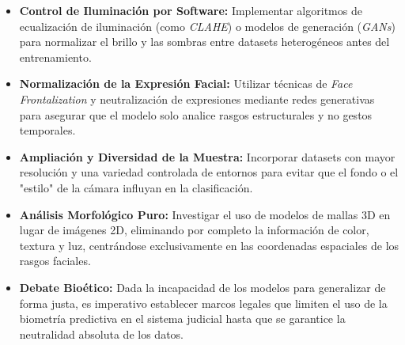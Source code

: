 \begin{itemize}
    \item \textbf{Control de Iluminación por Software:} Implementar algoritmos de ecualización de iluminación (como \textit{CLAHE}) o modelos de generación (\textit{GANs}) para normalizar el brillo y las sombras entre datasets heterogéneos antes del entrenamiento.
    \item \textbf{Normalización de la Expresión Facial:} Utilizar técnicas de \textit{Face Frontalization} y neutralización de expresiones mediante redes generativas para asegurar que el modelo solo analice rasgos estructurales y no gestos temporales.
    \item \textbf{Ampliación y Diversidad de la Muestra:} Incorporar datasets con mayor resolución y una variedad controlada de entornos para evitar que el fondo o el "estilo" de la cámara influyan en la clasificación.
    \item \textbf{Análisis Morfológico Puro:} Investigar el uso de modelos de mallas 3D en lugar de imágenes 2D, eliminando por completo la información de color, textura y luz, centrándose exclusivamente en las coordenadas espaciales de los rasgos faciales.
    \item \textbf{Debate Bioético:} Dada la incapacidad de los modelos para generalizar de forma justa, es imperativo establecer marcos legales que limiten el uso de la biometría predictiva en el sistema judicial hasta que se garantice la neutralidad absoluta de los datos.
\end{itemize}